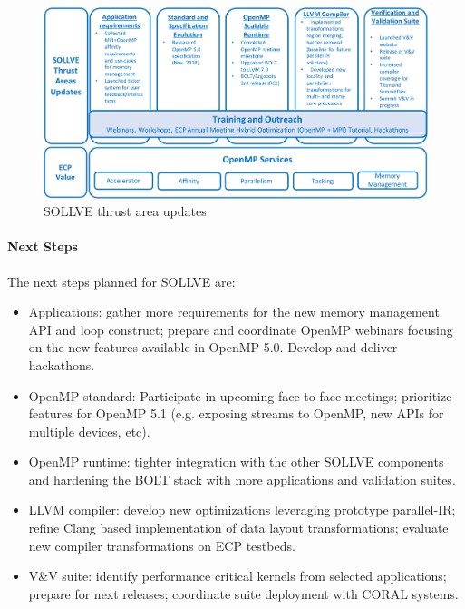 \begin{figure}[t]
\centering
\includegraphics[width=0.9\linewidth]{projects/2.3.2-Tools/2.3.2.11-SOLLVE/SOLLVE-progress}
\caption{\label{fig:sollve-update}SOLLVE thrust area updates}
\end{figure}

\paragraph*{Next Steps}
 The next steps planned for SOLLVE are:
\begin{itemize}
\item Applications: gather more requirements for  the new memory management API and loop construct; prepare and coordinate OpenMP webinars focusing on 
the new features available in OpenMP 5.0.
Develop and deliver hackathons. 
\item OpenMP standard: Participate in upcoming face-to-face meetings; %
 prioritize features for OpenMP 5.1 (e.g. exposing streams to OpenMP, new APIs for multiple devices, etc).
\item OpenMP runtime: tighter integration with the other SOLLVE components and hardening the BOLT stack with more applications and validation suites.
\item LLVM compiler: develop new optimizations leveraging prototype parallel-IR; refine Clang based implementation of data layout transformations; evaluate new compiler transformations on ECP testbeds.
\item V\&V suite: identify performance critical kernels from selected applications; prepare for next releases;  %
 coordinate suite deployment with CORAL systems.
\end{itemize}

